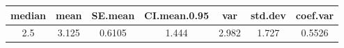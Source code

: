 \documentclass[]{article}
\begin{document}
\begin{longtable}[]{@{}ccccccc@{}}
\toprule
\begin{minipage}[b]{0.10\columnwidth}\centering\strut
median\strut
\end{minipage} & \begin{minipage}[b]{0.09\columnwidth}\centering\strut
mean\strut
\end{minipage} & \begin{minipage}[b]{0.11\columnwidth}\centering\strut
SE.mean\strut
\end{minipage} & \begin{minipage}[b]{0.17\columnwidth}\centering\strut
CI.mean.0.95\strut
\end{minipage} & \begin{minipage}[b]{0.09\columnwidth}\centering\strut
var\strut
\end{minipage} & \begin{minipage}[b]{0.11\columnwidth}\centering\strut
std.dev\strut
\end{minipage} & \begin{minipage}[b]{0.11\columnwidth}\centering\strut
coef.var\strut
\end{minipage}\tabularnewline
\midrule
\endhead
\begin{minipage}[t]{0.10\columnwidth}\centering\strut
2.5\strut
\end{minipage} & \begin{minipage}[t]{0.09\columnwidth}\centering\strut
3.125\strut
\end{minipage} & \begin{minipage}[t]{0.11\columnwidth}\centering\strut
0.6105\strut
\end{minipage} & \begin{minipage}[t]{0.17\columnwidth}\centering\strut
1.444\strut
\end{minipage} & \begin{minipage}[t]{0.09\columnwidth}\centering\strut
2.982\strut
\end{minipage} & \begin{minipage}[t]{0.11\columnwidth}\centering\strut
1.727\strut
\end{minipage} & \begin{minipage}[t]{0.11\columnwidth}\centering\strut
0.5526\strut
\end{minipage}\tabularnewline
\bottomrule
\end{longtable}
\end{document}
